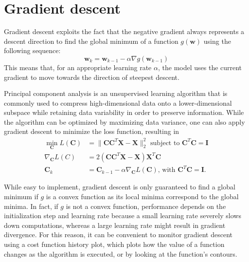 \documentclass{report}
\begin{document}
\section{Gradient descent}
Gradient descent exploits the fact that the negative gradient always represents a descent direction to find the global minimum of a function $\displaystyle g(\mathbf{w})$ using the following sequence:
\[\mathbf{w}_k = \mathbf{w}_{k - 1} - \alpha\nabla g(\mathbf{w}_{k - 1})\]
This means that, for an appropriate learning rate $\displaystyle \alpha$, the model uses the current gradient to move towards the direction of steepest descent.
\begin{examplebox}
    Principal component analysis is an unsupervised learning algorithm that is commonly used to compress high-dimensional data onto a lower-dimensional subspace while retaining data variability in order to preserve information. \newline
    While the algorithm can be optimized by maximizing data variance, one can also apply gradient descent to minimize the loss function, resulting in
    \begin{align*}
        \min_{\mathbf{C}} L(\mathbf{C}) &= \lVert \mathbf{CC}^T\mathbf{X} - \mathbf{X} \rVert_2^2 \text{ subject to } \mathbf{C}^T\mathbf{C} = \mathbf{I} \\
        \nabla_{\mathbf{C}}L(C) &= 2(\mathbf{CC}^T\mathbf{X} - \mathbf{X})\mathbf{X}^T\mathbf{C} \\
        \mathbf{C}_k &= \mathbf{C}_{k - 1} -\alpha\nabla_{\mathbf{C}}L(\mathbf{C}) \text{, with $\mathbf{C}^T\mathbf{C} = \mathbf{I}$.}
    \end{align*}
\end{examplebox}
\noindent While easy to implement, gradient descent is only guaranteed to find a global minimum if $\displaystyle g$ is a convex function as its local minima correspond to the global minima. \newline
In fact, if $\displaystyle g$ is not a convex function, performance depends on the initialization step and learning rate because a small learning rate severely slows down computations, whereas a large learning rate might result in gradient divergence. \newline
For this reason, it can be convenient to monitor gradient descent using a cost function history plot, which plots how the value of a function changes as the algorithm is executed, or by looking at the function's contours.
\end{document}
